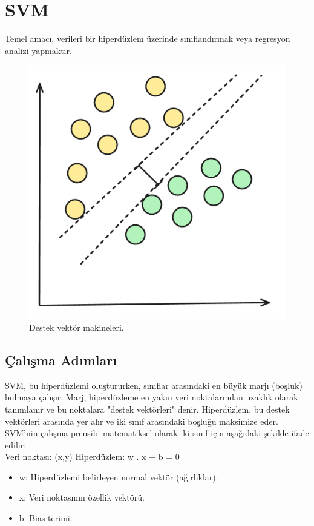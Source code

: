 \section{SVM}
Temel amacı, verileri bir hiperdüzlem üzerinde sınıflandırmak veya regresyon analizi yapmaktır.

\begin{figure}[h]
    \centering
    \includegraphics[width=1\textwidth]{images/svm.png}
    \caption{Destek vektör makineleri.}
    \label{fig:enter-label}
\end{figure}

\subsection{Çalışma Adımları}
SVM, bu hiperdüzlemi oluştururken, sınıflar arasındaki en büyük marjı (boşluk) bulmaya çalışır. Marj, hiperdüzleme en yakın veri noktalarından uzaklık olarak tanımlanır ve bu noktalara "destek vektörleri" denir. Hiperdüzlem, bu destek vektörleri arasında yer alır ve iki sınıf arasındaki boşluğu maksimize eder. SVM'nin çalışma prensibi matematiksel olarak iki sınıf için aşağıdaki şekilde ifade edilir:\\

Veri noktası: (x,y) Hiperdüzlem: w . x + b = 0
\begin{itemize}
    \item w: Hiperdüzlemi belirleyen normal vektör (ağırlıklar).
    \item x: Veri noktasının özellik vektörü.
    \item b: Bias terimi.
\end{itemize}

